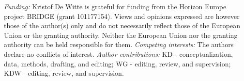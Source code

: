 \textit{Funding:} Kristof De Witte is grateful for funding from the Horizon Europe project BRIDGE (grant 101177154). Views and opinions expressed are however those of the author(s) only and do not necessarily reflect those of the European Union or the granting authority. Neither the European Union nor the granting authority can be held responsible for them.
\textit{Competing interests:} The authors declare no conflicts of interest.
\textit{Author contributions:} KD - conceptualization, data, methods, drafting, and editing; WG - editing, review, and supervision; KDW - editing, review, and supervision.
